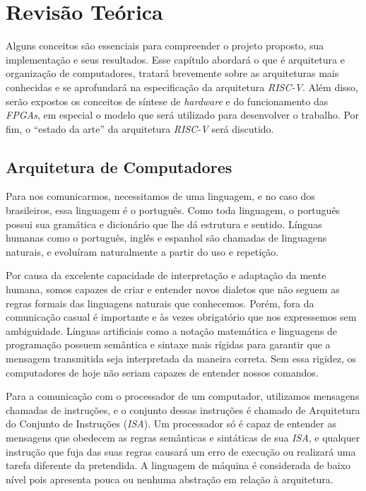 \chapter{Revisão Teórica}\label{cap2_revisao}
{ Alguns conceitos são essenciais para compreender o projeto proposto, sua
    implementação e seus resultados. Esse capítulo abordará o que é arquitetura
    e organização de computadores, tratará brevemente sobre as arquiteturas mais
    conhecidas e se aprofundará na especificação da arquitetura \textit{RISC-V}.
    Além disso, serão expostos os conceitos de síntese de \textit{hardware} e
    do funcionamento das \textit{FPGAs}, em especial o modelo que será utilizado
    para desenvolver o trabalho.
    Por fim, o ``estado da arte'' da arquitetura \textit{RISC-V} será discutido.
}

\section{Arquitetura de Computadores}
{ Para nos comunicarmos, necessitamos de uma linguagem, e no caso dos
    brasileiros, essa linguagem é o português. Como toda linguagem, o português
    possui sua gramática e dicionário que lhe dá estrutura e sentido. Línguas
    humanas como o português, inglês e espanhol são chamadas de linguagens
    naturais, e evoluíram naturalmente a partir do uso e
    repetição.~\cite{lyons1991natural}
}

{ Por causa da excelente capacidade de interpretação e adaptação da mente
    humana, somos capazes de criar e entender novos dialetos que não seguem as
    regras formais das linguagens naturais que conhecemos. Porém, fora da
    comunicação casual é importante e às vezes obrigatório que nos expressemos
    sem ambiguidade. Línguas artificiais como a notação matemática e linguagens
    de programação possuem semântica e sintaxe mais rígidas para garantir que
    a mensagem transmitida seja interpretada da maneira correta. Sem essa
    rigidez, os computadores de hoje não seriam capazes de entender nossos
    comandos.
}

{ Para a comunicação com o processador de um computador, utilizamos mensagens
    chamadas de instruções, e o conjunto dessas instruções é chamado de
    Arquitetura do Conjunto de Instruções (\textit{ISA}). Um processador só é
    capaz de entender as mensagens que obedecem as regras semânticas e
    sintáticas de sua \textit{ISA}, e qualquer instrução que fuja das suas
    regras causará um erro de execução ou realizará uma tarefa diferente da
    pretendida. A linguagem de máquina é considerada de baixo nível pois
    apresenta pouca ou nenhuma abstração em relação à arquitetura.
}

